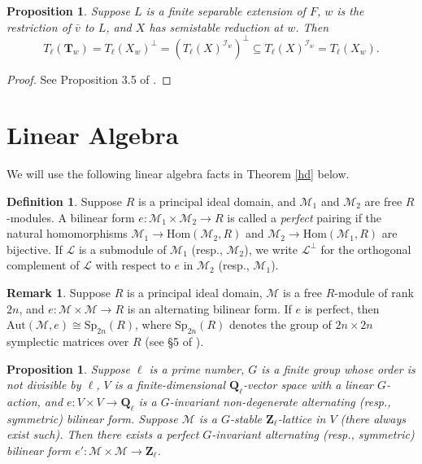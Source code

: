 \documentclass{amsart}
\def\Q{{\mathbf Q}}
\def\Z{{\mathbf Z}}
\def\Aut{\mathrm{Aut}}
\def\Hom{\mathrm{Hom}}
\def\I{{\mathcal I}}
\def\Sp{\mathrm{Sp}}
\def\M{\mathcal{M}}
\def\L{\mathcal{L}}
\def\T{{\mathbf T}}
\newtheorem{prop}[thm]{Proposition}
\theoremstyle{definition}
\newtheorem{defn}[thm]{Definition}
\newtheorem{rem}[thm]{Remark}
\begin{document}
\begin{prop}
\label{orthogeqn}
Suppose $L$ is a finite separable extension of $F$,  $w$
is the restriction of ${\bar v}$ to $L$, and
$X$ has semistable reduction at $w$.
Then$$ T_\ell(\T_w) = T_\ell(X_w)^\perp
= (T_\ell(X)^{\I_w})^\perp
 \subseteq  
T_\ell(X)^{\I_w} = T_\ell(X_w).$$
\end{prop}

\begin{proof}
See Proposition 3.5 of \cite{SGA}.
\end{proof}

\section{Linear Algebra}

We will use the following linear algebra facts 
in Theorem \ref{hd} below.

\begin{defn}
Suppose $R$ is a principal ideal domain, and $\M_1$ 
and $\M_2$ are free $R$-modules.
A bilinear form $e : \M_1 \times \M_2 \to R$ 
is called a {\it perfect} pairing if the natural 
homomorphisms 
$\M_1 \to \Hom(\M_2,R)$ and $\M_2 \to \Hom(\M_1,R)$
are bijective.
If $\L$ is a submodule of $\M_1$ (resp., $\M_2$), we write 
$\L^{\perp}$ for the orthogonal complement of $\L$
with respect to $e$ in $\M_2$ (resp., $\M_1$).
\end{defn}

\begin{rem}
\label{perf}
Suppose $R$ is a principal ideal domain,  
$\M$  is a free $R$-module of rank $2n$, and
$e : \M \times \M \to R$ is an alternating bilinear form.
If $e$ is perfect, then $\Aut(\M,e) \cong \Sp_{2n}(R)$,
where  
$\Sp_{2n}(R)$ denotes the group of $2n \times 2n$ symplectic
matrices over $R$ (see \S{5} of \cite{Bourbaki}).
\end{rem}

\begin{prop}
\label{linalg}
Suppose $\ell$ is a prime number, $G$ is a finite group whose order
is not divisible by $\ell$, $V$ is a finite-dimensional
$\Q_\ell$-vector space with a linear $G$-action, and
$e:V \times V \to \Q_\ell$ is a $G$-invariant
non-degenerate alternating (resp., symmetric) bilinear form. 
Suppose $\M$ is a $G$-stable $\Z_\ell$-lattice 
in $V$ (there always exist such). 
Then there exists a perfect $G$-invariant alternating 
(resp., symmetric) bilinear
form $e':\M \times \M \to \Z_\ell$.
\end{prop}
\end{document}
